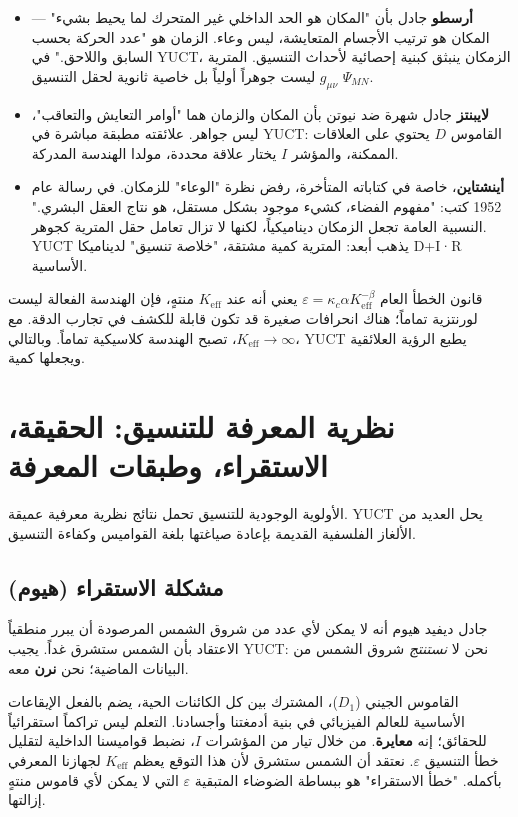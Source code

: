 \documentclass[12pt,a4paper]{article}
\newcommand{\Keff}{K_{\mathrm{eff}}}
\begin{document}
	\begin{itemize}
		\item \textbf{أرسطو} جادل بأن "المكان هو الحد الداخلي غير المتحرك لما يحيط بشيء" — المكان هو ترتيب الأجسام المتعايشة، ليس وعاء. الزمان هو "عدد الحركة بحسب السابق واللاحق." في YUCT، الزمكان ينبثق كبنية إحصائية لأحداث التنسيق. المترية \(g_{\mu\nu}\) ليست جوهراً أولياً بل خاصية ثانوية لحقل التنسيق \(\Psi_{MN}\).
		\item \textbf{لايبنتز} جادل شهرة ضد نيوتن بأن المكان والزمان هما "أوامر التعايش والتعاقب"، ليس جواهر. علائقته مطبقة مباشرة في YUCT: القاموس \(D\) يحتوي على العلاقات الممكنة، والمؤشر \(I\) يختار علاقة محددة، مولدا الهندسة المدركة.
		\item \textbf{أينشتاين}، خاصة في كتاباته المتأخرة، رفض نظرة "الوعاء" للزمكان. في رسالة عام 1952 كتب: "مفهوم الفضاء، كشيء موجود بشكل مستقل، هو نتاج العقل البشري." النسبية العامة تجعل الزمكان ديناميكياً، لكنها لا تزال تعامل حقل المترية كجوهر. YUCT يذهب أبعد: المترية كمية مشتقة، "خلاصة تنسيق" لديناميكا D+I·R الأساسية.
	\end{itemize}
	
	قانون الخطأ العام \(\varepsilon = \kappa_c \alpha K_{\mathrm{eff}}^{-\beta}\) يعني أنه عند \(K_{\mathrm{eff}}\) منتهٍ، فإن الهندسة الفعالة ليست لورنتزية تماماً؛ هناك انحرافات صغيرة قد تكون قابلة للكشف في تجارب الدقة. مع \(K_{\mathrm{eff}} \to \infty\)، تصبح الهندسة كلاسيكية تماماً. وبالتالي، YUCT يطبع الرؤية العلائقية ويجعلها كمية.
	
	\section{نظرية المعرفة للتنسيق: الحقيقة، الاستقراء، وطبقات المعرفة}
	\label{sec:epistemology}
	
	الأولوية الوجودية للتنسيق تحمل نتائج نظرية معرفية عميقة. YUCT يحل العديد من الألغاز الفلسفية القديمة بإعادة صياغتها بلغة القواميس وكفاءة التنسيق.
	
	\subsection{مشكلة الاستقراء (هيوم)}
	
	جادل ديفيد هيوم أنه لا يمكن لأي عدد من شروق الشمس المرصودة أن يبرر منطقياً الاعتقاد بأن الشمس ستشرق غداً. يجيب YUCT: نحن لا \emph{نستنتج} شروق الشمس من البيانات الماضية؛ نحن \textbf{نرن} معه.
	
	القاموس الجيني (\(D_1\))، المشترك بين كل الكائنات الحية، يضم بالفعل الإيقاعات الأساسية للعالم الفيزيائي في بنية أدمغتنا وأجسادنا. التعلم ليس تراكماً استقرائياً للحقائق؛ إنه \textbf{معايرة}. من خلال تيار من المؤشرات \(I\)، نضبط قواميسنا الداخلية لتقليل خطأ التنسيق \(\varepsilon\). نعتقد أن الشمس ستشرق لأن هذا التوقع يعظم \(\Keff\) لجهازنا المعرفي بأكمله. "خطأ الاستقراء" هو ببساطة الضوضاء المتبقية \(\varepsilon\) التي لا يمكن لأي قاموس منتهٍ إزالتها.
	
\end{document}
